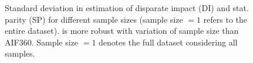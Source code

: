 \begin{figure}
	\centering
	
	\caption[Robustness of fairness verification]{Standard deviation in estimation of disparate impact (DI) and stat. parity (SP)  for different sample sizes (sample size $ = 1 $ refers to the entire dataset). {\justicia} is more robust with variation of sample size than  AIF360. Sample size $ = 1 $ denotes the full dataset considering all samples.}
	\label{fairness_justicia_fig:sample-size}
\end{figure}




